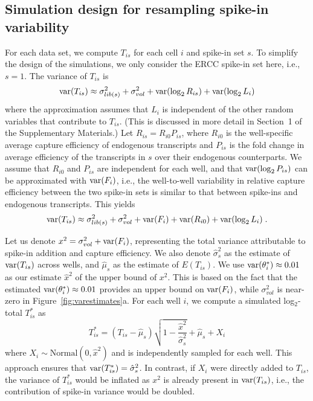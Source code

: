 \documentclass{article}
\newcommand{\suppsecmath}{1}
\begin{document}
\subsection{Simulation design for resampling spike-in variability}
For each data set, we compute $T_{is}$ for each cell $i$ and spike-in set $s$.
To simplify the design of the simulations, we only consider the ERCC spike-in set here, i.e., $s=1$.
The variance of $T_{is}$ is
\[
    \mbox{var}(T_{is}) \approx \sigma^2_{lib(s)} + \sigma^2_{vol} + \mbox{var}(\log_2 R_{is}) + \mbox{var}(\log_2 L_i)
\]
where the approximation assumes that $L_i$ is independent of the other random variables that contribute to $T_{is}$.
(This is discussed in more detail in Section~\suppsecmath{} of the Supplementary Materials.)
Let $R_{is} = R_{i0}P_{is}$, where $R_{i0}$ is the well-specific average capture efficiency of endogenous transcripts and $P_{is}$ is the fold change in average efficiency of the transcripts in $s$ over their endogenous counterparts.
We assume that $R_{i0}$ and $P_{is}$ are independent for each well, and that $\mbox{var}(\log_2 P_{is})$ can be approximated with $\mbox{var}(F_i)$,
i.e., the well-to-well variability in relative capture efficiency between the two spike-in sets is similar to that between spike-ins and endogenous transcripts.
This yields
\[
    \mbox{var}(T_{is}) \approx \sigma^2_{lib(s)} + \sigma^2_{vol} + \mbox{var}(F_i) + \mbox{var}(R_{i0}) + \mbox{var}(\log_2 L_i) \;.
\]


Let us denote $x^2 = \sigma^2_{vol} + \mbox{var}(F_i)$, representing the total variance attributable to spike-in addition and capture efficiency.
We also denote $\hat\sigma^2_s$ as the estimate of $\mbox{var}(T_{is})$ across wells, and $\hat\mu_s$ as the estimate of $E(T_{is})$.
We use $\mbox{var}(\theta^*_i) \approx 0.01$ as our estimate $\hat{x}^2$ of the upper bound of $x^2$.
This is based on the fact that the estimated $\mbox{var}(\theta^*_i)\approx 0.01$ provides an upper bound on $\mbox{var}(F_i)$, while $\sigma^2_{vol}$ is near-zero in Figure~\ref{fig:varestimates}a.
For each well $i$, we compute a simulated log$_2$-total $T^*_{is}$ as
\[
    T^*_{is} = (T_{is} - \hat\mu_s)\sqrt{1-\frac{ \hat{x}^2}{\hat\sigma^2_s}} + \hat\mu_s + X_i
\]
where $X_i \sim \mbox{Normal}(0, \hat{x}^2)$ and is independently sampled for each well.
This approach ensures that $\mbox{var}(T^*_{is}) = \hat\sigma^2_s$.
In contrast, if $X_i$ were directly added to $T_{is}$, the variance of $T^*_{is}$ would be inflated as $x^2$ is already present in $\mbox{var}(T_{is})$, i.e., the contribution of spike-in variance would be doubled.
\end{document}
